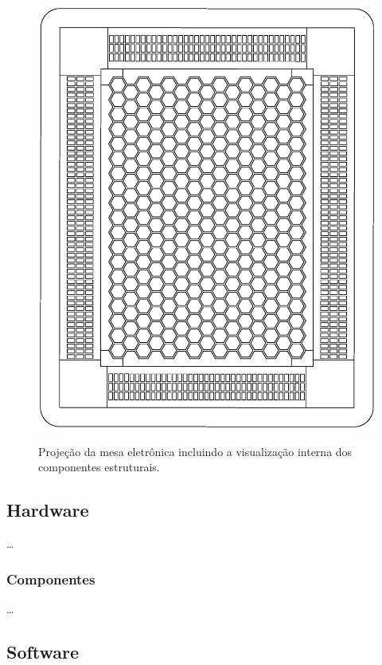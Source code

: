 \documentclass[a4paper,10pt]{article}
\begin{document}
\begin{center}
\begin{figure}[h!]
	\center
	\includegraphics[angle=0, scale=0.40]{./img/projeto-v02.ps}
	\label{figura_projeto}
	\caption{Projeção da mesa eletrônica incluindo a visualização interna dos componentes estruturais.}
\end{figure}
\end{center}


\subsection{Hardware}

\ldots

\subsubsection{Componentes}

\ldots

\subsection{Software}
\end{document}
